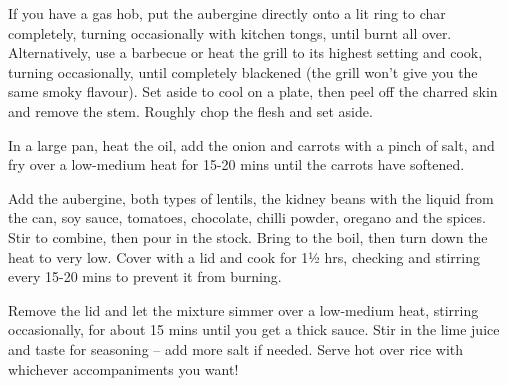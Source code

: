 \begin{method}
  	If you have a gas hob, put the aubergine directly onto a lit ring to char
completely, turning occasionally with kitchen tongs, until burnt all
over. Alternatively, use a barbecue or heat the grill to its highest setting
and cook, turning occasionally, until completely blackened (the grill
won’t give you the same smoky flavour). Set aside to cool on a plate,
then peel off the charred skin and remove the stem. Roughly chop the
flesh and set aside.

In a large pan, heat the oil, add the onion and carrots with a pinch of
salt, and fry over a low-medium heat for 15-20 mins until the carrots
have softened.

Add the aubergine, both types of lentils, the kidney beans with the
liquid from the can, soy sauce, tomatoes, chocolate, chilli powder,
oregano and the spices. Stir to combine, then pour in the stock. Bring
to the boil, then turn down the heat to very low. Cover with a lid and
cook for 1½ hrs, checking and stirring every 15-20 mins to prevent it
from burning.

Remove the lid and let the mixture simmer over a low-medium heat,
stirring occasionally, for about 15 mins until you get a thick sauce. Stir
in the lime juice and taste for seasoning – add more salt if needed.
Serve hot over rice with whichever accompaniments you want!
  
\end{method}




